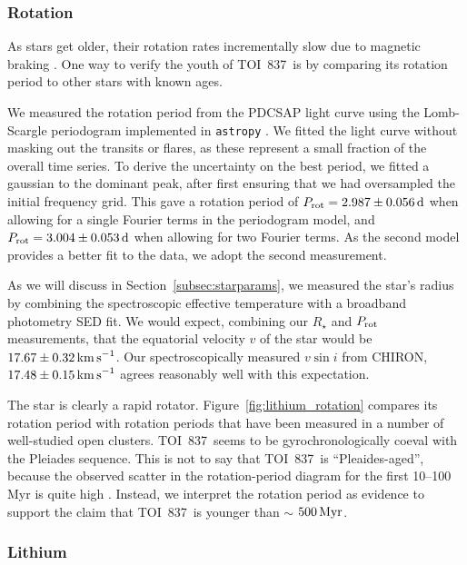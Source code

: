 \documentclass[12pt,twocolumn,tighten]{aastex63}
\newcommand{\tn}{TOI~837} %
\begin{document}
\subsubsection{Rotation}

As stars get older, their rotation rates incrementally slow due to
magnetic braking \cite{weber_angular_1967,skumanich_time_1972}.  One
way to verify the youth of \tn\ is by comparing its rotation period to
other stars with known ages.

We measured the rotation period from the PDCSAP light curve using the
Lomb-Scargle periodogram implemented in \texttt{astropy}
\citep{lomb_1976,scargle_studies_1982,vanderplas_periodograms_2015}.
We fitted the light curve without masking out the transits or flares,
as these represent a small fraction of the overall time series.  To
derive the uncertainty on the best period, we fitted a gaussian to the
dominant peak, after first ensuring that we had oversampled the
initial frequency grid.  This gave a rotation period of $P_{\rm rot} =
2.987 \pm 0.056\,{\rm d}$ when allowing for a single Fourier terms in
the periodogram model, and $P_{\rm rot} = 3.004 \pm 0.053\,{\rm d}$
when allowing for two Fourier terms.  As the second model provides a
better fit to the data, we adopt the second measurement.

As we will discuss in Section~\ref{subsec:starparams}, we measured the
star's radius by combining the spectroscopic effective temperature
with a broadband photometry SED fit.  We would expect, combining our
$R_\star$ and $P_{\rm rot}$ measurements, that the equatorial velocity
$v$ of the star would be $17.67 \pm 0.32 \,{\rm km\,s}^{-1}$.  Our
spectroscopically measured $v\sin i$ from CHIRON, $17.48 \pm 0.15
\,{\rm km\,s}^{-1}$ agrees reasonably well with this expectation.

The star is clearly a rapid rotator.
Figure~\ref{fig:lithium_rotation} compares its rotation period with
rotation periods that have been measured in a number of well-studied
open clusters.  \tn\ seems to be gyrochronologically coeval with the
Pleiades sequence.  This is not to say that \tn\ is ``Pleaides-aged'',
because the observed scatter in the rotation-period diagram for the
first 10--100$\,$Myr is quite high \citep[see Figure~9
of][]{rebull_rotation_2020}.  Instead, we interpret the rotation
period as evidence to support the claim that \tn\ is younger than $\sim$
$500\,{\rm Myr}$.


\subsubsection{Lithium}
\end{document}
